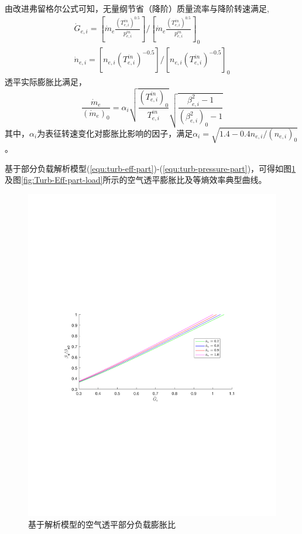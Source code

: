 由改进弗留格尔公式可知，无量纲节省（降阶）质量流率与降阶转速满足\cite{Compressor-thermo-02, AA-CAES-Simulation-19},
\begin{subequations}
\begin{gather}
{\dot G_{e,i}} = [{{{\dot m}_e}\frac{{{{({T_{e,i}^{in}})}^{0.5}}}}{{p_{e,i}^{in}}}}]/{[{{{\dot m}_e}\frac{{{{( {T_{e,i}^{in}})}^{0.5}}}}{{p_{e,i}^{in}}}}]_0} \label{equ:reduced-turb-mass-flow} \\
{\dot n_{e,i}} = [{{n_{e,i}}{{({T_{e,i}^{in}})}^{ - 0.5}}}]/{[{{n_{e,i}}{{({T_{e,i}^{in}})}^{ - 0.5}}} ]_0}\label{equ:reduced-turb-speed}
\end{gather}
\end{subequations}
透平实际膨胀比满足\cite{AA-CAES-Simulation-19}，
\begin{equation}
\label{equ:turb-pressure-part}
\frac{{{{\dot m}_e}}}{{{{({{{\dot m}_e}})}_0}}} = {\alpha _i}\sqrt {\frac{{{{({T_{e,i}^{in}})}_0}}}{{T_{e,i}^{in}}}} \sqrt {\frac{{\beta _{e,i}^2 - 1}}{{{{({\beta _{e,i}^2})}_0} - 1}}}
\end{equation}
其中，$\alpha_i$为表征转速变化对膨胀比影响的因子，满足$\alpha_i=\sqrt{1.4-0.4n_{e,i}/(n_{e,i})_0}$。

基于部分负载解析模型(\ref{equ:turb-eff-part})-(\ref{equ:turb-pressure-part})，可得如图\ref{fig:Turb-Ratio-off-design}及图\ref{fig:Turb-Eff-part-load}所示的空气透平膨胀比及等熵效率典型曲线。

\begin{figure}[H] %
  \centering
  \includegraphics[scale=0.65]{figures/Chap2-2-Turb-Ratio-off-design.pdf}
  \caption{基于解析模型的空气透平部分负载膨胀比}
  \label{fig:Turb-Ratio-off-design}
\end{figure}

